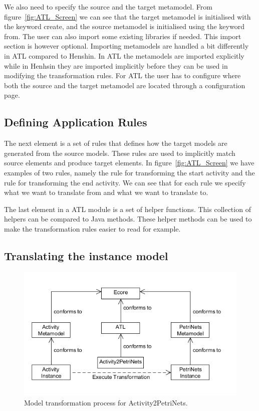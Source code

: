 We also need to specify the source and the target metamodel. From
figure~\ref{fig:ATL_Screen} we can see that the target metamodel is initialised 
with the keyword create, and the source metamodel is initialised using the
keyword from. The user can also import some existing libraries if needed. This
import section is however optional. Importing metamodels are handled a bit
differently in ATL compared to Henshin. In ATL the metamodels are imported
explicitly while in Henhsin they are imported implicitly before they can be used
in modifying the transformation rules. For ATL the user has to configure where
both the source and the target metamodel are located through a configuration
page. 

\subsection{Defining Application Rules}

The next element is a set of rules that defines how the target models are
generated from the source models. These rules are used to implicitly match
source elements and produce target elements. In figure~\ref{fig:ATL_Screen} we
have examples of two rules, namely the rule for transforming the start activity
and the rule for transforming the end activity. We can see that for each rule we
specify what we want to translate from and what we want to translate to. 

The last element in a ATL module is a set of helper functions. This collection
of helpers can be compared to Java methods. These helper methods can be used to
make the transformation rules easier to read for example.

\subsection{Translating the instance model}

\begin{figure}[H]
	\centering
	\includegraphics[scale=0.5]{figures/ATL.png}
	\caption[Model Transformation process for ATL]
	{Model transformation process for Activity2PetriNets.}
	\label{fig:ATL}
\end{figure}

